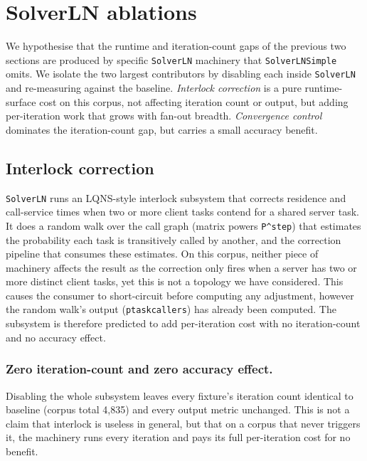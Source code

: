 \section{SolverLN ablations}
\label{sec:eval-ablations}

We hypothesise that the runtime and iteration-count gaps of the previous two sections are produced by specific \texttt{SolverLN} machinery that \texttt{SolverLNSimple} omits. We isolate the two largest contributors by disabling each inside \texttt{SolverLN} and re-measuring against the baseline. \emph{Interlock correction} is a pure runtime-surface cost on this corpus, not affecting iteration count or output, but adding per-iteration work that grows with fan-out breadth. \emph{Convergence control} dominates the iteration-count gap, but carries a small accuracy benefit.

\subsection{Interlock correction}
\label{sec:eval-interlock}

\texttt{SolverLN} runs an LQNS-style interlock subsystem that corrects residence and call-service times when two or more client tasks contend for a shared server task. It does a random walk over the call graph (matrix powers \texttt{P\textasciicircum step}) that estimates the probability each task is transitively called by another, and the correction pipeline that consumes these estimates. On this corpus, neither piece of machinery affects the result as the correction only fires when a server has two or more distinct client tasks, yet this is not a topology we have considered. This causes the consumer to short-circuit before computing any adjustment, however the random walk's output (\texttt{ptaskcallers}) has already been computed. The subsystem is therefore predicted to add per-iteration cost with no iteration-count and no accuracy effect.

\subsubsection*{Zero iteration-count and zero accuracy effect.} 
Disabling the whole subsystem leaves every fixture's iteration count identical to baseline (corpus total 4,835) and every output metric unchanged. This is not a claim that interlock is useless in general, but that on a corpus that never triggers it, the machinery runs every iteration and pays its full per-iteration cost for no benefit.

